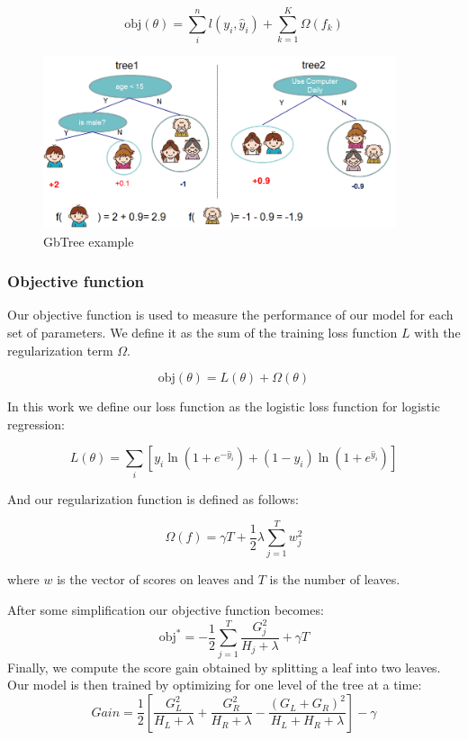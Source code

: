 \documentclass[cic,tc,english]{iiufrgs}
\begin{document}
$$
\text{obj}(\theta) = \sum_i^n l(y_i, \hat{y}_i) + \sum_{k=1}^K \Omega(f_k)
$$

\begin{figure}
    \caption{GbTree example}
    \begin{center}
        \includegraphics[width=28em]{twocart}
    \end{center}
    \label{fig:ex1}
\end{figure}

\subsubsection{Objective function}
Our objective function is used to measure the performance of our model for each set of parameters. We define it as the sum of the training loss function $L$ with the regularization term $\Omega$.

$$\text{obj}(\theta) = L(\theta) + \Omega(\theta)$$

In this work we define our loss function as the logistic loss function for logistic regression:

$$L(\theta) = \sum_i[ y_i\ln (1+e^{-\hat{y}_i}) + (1-y_i)\ln (1+e^{\hat{y}_i})]$$

And our regularization function is defined as follows:

$$\Omega(f) = \gamma T + \frac{1}{2}\lambda \sum_{j=1}^T w_j^2$$

where \(w\) is the vector of scores on leaves and \(T\) is the number of leaves.

After some simplification our objective function becomes:
$$
\text{obj}^\ast = -\frac{1}{2} \sum_{j=1}^T \frac{G_j^2}{H_j+\lambda} + \gamma T
$$
Finally, we compute the score gain obtained by splitting a leaf into two leaves. Our model is then trained by optimizing for one level of the tree at a time:
$$
Gain = \frac{1}{2} \left[\frac{G_L^2}{H_L+\lambda}+\frac{G_R^2}{H_R+\lambda}-\frac{(G_L+G_R)^2}{H_L+H_R+\lambda}\right] - \gamma
$$
\end{document}
